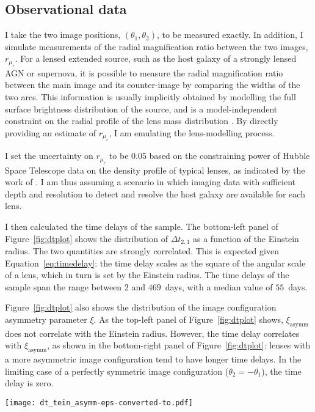 \documentclass{aa}
\def\asymm{\xi_{\mathrm{asymm}}}
\def\rmur{r_{\mu_r}}
\def\Fref#1{Figure~\ref{#1}\xspace}
\def\Eref#1{Equation~\ref{#1}\xspace}
\begin{document}
\subsection{Observational data}\label{ssec:data}

I take the two image positions, $(\theta_1, \theta_2)$, to be measured exactly.
In addition, I simulate measurements of the radial magnification ratio between the two images, $\rmur$. For a lensed extended source, such as the host galaxy of a strongly lensed AGN or supernova, it is possible to measure the radial magnification ratio between the main image and its counter-image by comparing the widths of the two arcs. This information is usually implicitly obtained by modelling the full surface brightness distribution of the source, and is a model-independent constraint on the radial profile of the lens mass distribution \citep{Son18, Sha++21}.
By directly providing an estimate of $\rmur$, I am emulating the lens-modelling process.

I set the uncertainty on $\rmur$ to be $0.05$ based on the constraining power of Hubble Space Telescope data on the density profile of typical lenses, as indicated by the work of \citet{Sha++21}.
I am thus assuming a scenario in which imaging data with sufficient depth and resolution to detect and resolve the host galaxy are available for each lens.

I then calculated the time delays of the sample.
The bottom-left panel of \Fref{fig:dtplot} shows the distribution of $\Delta t_{2,1}$ as a function of the Einstein radius. The two quantities are strongly correlated. This is expected given \Eref{eq:timedelay}: the time delay scales as the square of the angular scale of a lens, which in turn is set by the Einstein radius. 
The time delays of the sample span the range between $2$ and $469$~days, with a median value of $55$~days.

\Fref{fig:dtplot} also shows the distribution of the image configuration asymmetry parameter $\xi$. As the top-left panel of \Fref{fig:dtplot} shows, $\asymm$ does not correlate with the Einstein radius.
However, the time delay correlates with $\asymm$, as shown in the bottom-right panel of \Fref{fig:dtplot}: lenses with a more asymmetric image configuration tend to have longer time delays. In the limiting case of a perfectly symmetric image configuration ($\theta_2 = -\theta_1$), the time delay is zero.
%
\begin{figure*}
\texttt{[image: dt\_tein\_asymm-eps-converted-to.pdf]}
\caption{
Distribution in the time delay between images 2 and 1, as well as the Einstein radius, and the image configuration asymmetry parameter $\asymm$ of the lens sample.
\label{fig:dtplot}
}
\end{figure*}
\end{document}
